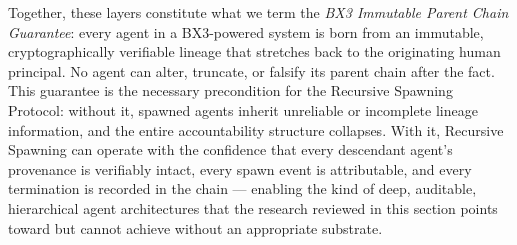 Together, these layers constitute what we term the \emph{BX3 Immutable Parent Chain Guarantee}: every agent in a BX3-powered system is born from an immutable, cryptographically verifiable lineage that stretches back to the originating human principal. No agent can alter, truncate, or falsify its parent chain after the fact. This guarantee is the necessary precondition for the Recursive Spawning Protocol: without it, spawned agents inherit unreliable or incomplete lineage information, and the entire accountability structure collapses. With it, Recursive Spawning can operate with the confidence that every descendant agent's provenance is verifiably intact, every spawn event is attributable, and every termination is recorded in the chain — enabling the kind of deep, auditable, hierarchical agent architectures that the research reviewed in this section points toward but cannot achieve without an appropriate substrate.

